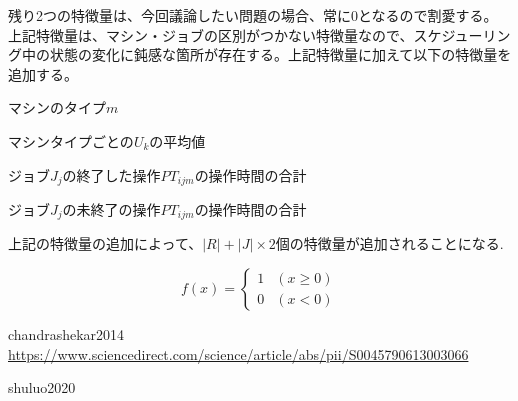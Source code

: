 \documentclass[twocolumn, a4j]{ltjsarticle}
\begin{document}
\noindent
残り2つの特徴量は、今回議論したい問題の場合、常に$0$となるので割愛する。
上記特徴量は、マシン・ジョブの区別がつかない特徴量なので、スケジューリング中の状態の変化に鈍感な箇所が存在する。上記特徴量に加えて以下の特徴量を追加する。

\begin{description}[style=multiline, leftmargin=10em]
  \item[$Type_{M_m}$] マシンのタイプ$m$
\end{description}

\begin{description}[style=multiline, leftmargin=15em]
  \item[$\bar{U_{k}} (Type_{M_k} = Type_{M_m})$] マシンタイプごとの$U_k$の平均値
  \item[$CPOC_j$] ジョブ$J_j$の終了した操作$PT_{ijm}$の操作時間の合計
  \item[$CPOR_j$] ジョブ$J_j$の未終了の操作$PT_{ijm}$の操作時間の合計
\end{description}

上記の特徴量の追加によって、$|R|+|J|\times2$個の特徴量が追加されることになる.

\begin{equation}
  f(x) = \left\{
    \begin{array}{ll}
    1 & (x \geq 0)\\
    0 & (x < 0)
    \end{array}
    \right.
\end{equation}

\begin{thebibliography}{99}
   chandrashekar2014 \\
  \url{https://www.sciencedirect.com/science/article/abs/pii/S0045790613003066}

   shuluo2020
\end{thebibliography}
\end{document}
